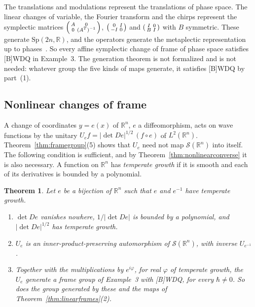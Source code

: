 \documentclass[11pt]{article}
\newtheorem{theorem}{Theorem}[section]
\theoremstyle{definition}
\begin{document}
The translations and modulations represent the translations of phase space. The linear changes of
variable, the Fourier transform and the chirps represent the symplectic matrices
$\begin{psmallmatrix} A & 0 \\ 0 & (A^T)^{-1}\end{psmallmatrix}$,
$\begin{psmallmatrix} 0 & I \\ -I & 0\end{psmallmatrix}$ and
$\begin{psmallmatrix} I & 0 \\ B & I\end{psmallmatrix}$ with $B$ symmetric. These generate
$\mathrm{Sp}(2n, \mathbb R)$, and the operators generate the metaplectic representation up to
phases~\cite[Ch.~4]{folland}. So every affine symplectic change of frame of phase space satisfies
[B]WDQ in Example~3. The generation theorem is not formalized and is not needed: whatever group
the five kinds of maps generate, it satisfies [B]WDQ by part~(1).

\subsection{Nonlinear changes of frame}
\label{sec:nonlinearframes}

A change of coordinates $y = e(x)$ of $\mathbb R^n$, $e$ a diffeomorphism, acts on wave functions
by the unitary $U_e f = |\det De|^{1/2}\,(f \circ e)$ of $L^2(\mathbb R^n)$.
Theorem~\ref{thm:framegroup}(5) shows that $U_e$ need not map $\mathcal S(\mathbb R^n)$ into
itself. The following condition is sufficient, and by Theorem~\ref{thm:nonlinearconverse} it is
also necessary. A function on $\mathbb R^n$ has \emph{temperate growth} if it is smooth and each of
its derivatives is bounded by a polynomial.

\begin{theorem}\label{thm:nonlinearframes}
  Let $e$ be a bijection of $\mathbb R^n$ such that $e$ and $e^{-1}$ have temperate growth.
  \begin{enumerate}
    \item $\det De$ vanishes nowhere, $1/|\det De|$ is bounded by a polynomial, and
      $|\det De|^{1/2}$ has temperate growth.
    \item $U_e$ is an inner-product-preserving automorphism of $\mathcal S(\mathbb R^n)$, with
      inverse $U_{e^{-1}}$.
    \item Together with the multiplications by $e^{i\varphi}$, for real $\varphi$ of temperate
      growth, the $U_e$ generate a frame group of Example~3 with [B]WDQ, for every
      $\hbar \ne 0$. So does the group generated by these and the maps of
      Theorem~\ref{thm:linearframes}(2).
  \end{enumerate}
\end{theorem}
\end{document}
